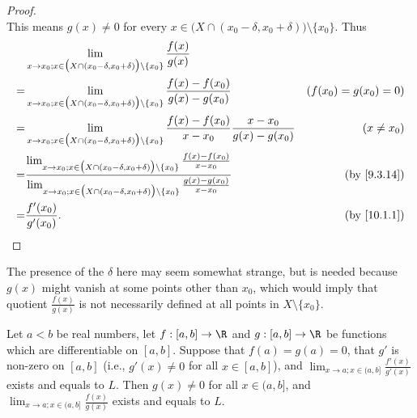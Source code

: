 \begin{proof}
\[  \]
  This means \(g(x) \neq 0\) for every \(x \in \big(X \cap (x_0 - \delta, x_0 + \delta)\big) \setminus \{x_0\}\).
  Thus
  \begin{align*}
      & \lim_{x \to x_0 ; x \in \big(X \cap (x_0 - \delta, x_0 + \delta)\big) \setminus \{x_0\}} \frac{f(x)}{g(x)}                                                                                                                                                                        \\
    = & \lim_{x \to x_0 ; x \in \big(X \cap (x_0 - \delta, x_0 + \delta)\big) \setminus \{x_0\}} \frac{f(x) - f(x_0)}{g(x) - g(x_0)}                                                                                                                          & (f(x_0) = g(x_0) = 0)     \\
    = & \lim_{x \to x_0 ; x \in \big(X \cap (x_0 - \delta, x_0 + \delta)\big) \setminus \{x_0\}} \frac{f(x) - f(x_0)}{x - x_0} \frac{x - x_0}{g(x) - g(x_0)}                                                                                                  & (x \neq x_0)              \\
    = & \frac{\lim_{x \to x_0 ; x \in \big(X \cap (x_0 - \delta, x_0 + \delta)\big) \setminus \{x_0\}} \frac{f(x) - f(x_0)}{x - x_0}}{\lim_{x \to x_0 ; x \in \big(X \cap (x_0 - \delta, x_0 + \delta)\big) \setminus \{x_0\}} \frac{g(x) - g(x_0)}{x - x_0}} & \text{(by \cref{9.3.14})} \\
    = & \frac{f'(x_0)}{g'(x_0)}.                                                                                                                                                                                                                              & \text{(by \cref{10.1.1})}
  \end{align*}
\end{proof}

\begin{note}
  The presence of the \(\delta\) here may seem somewhat strange, but is needed because \(g(x)\) might vanish at some points other than \(x_0\), which would imply that quotient \(\frac{f(x)}{g(x)}\) is not necessarily defined at all points in \(X \setminus \{x_0\}\).
\end{note}

\begin{proposition}\label{10.5.2}
  Let \(a < b\) be real numbers, let \(f : [a, b] \to \R\) and \(g : [a, b] \to \R\) be functions which are differentiable on \([a, b]\).
  Suppose that \(f(a) = g(a) = 0\), that \(g'\) is non-zero on \([a, b]\) (i.e., \(g'(x) \neq 0\) for all \(x \in [a, b]\)), and \(\lim_{x \to a ; x \in (a, b]} \frac{f'(x)}{g'(x)}\) exists and equals to \(L\).
  Then \(g(x) \neq 0\) for all \(x \in (a, b]\), and \(\lim_{x \to a ; x \in (a, b]} \frac{f(x)}{g(x)}\) exists and equals to \(L\).
\end{proposition}

